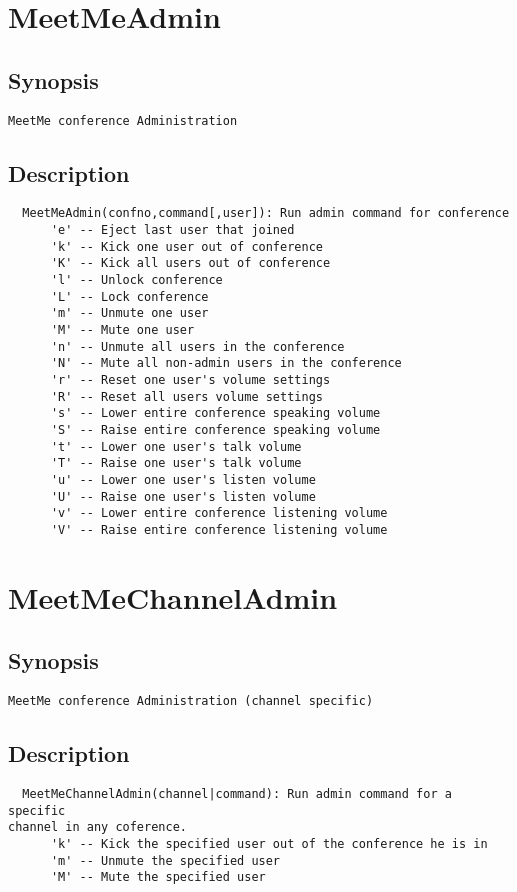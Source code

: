 \section{MeetMeAdmin}
\subsection{Synopsis}
\begin{verbatim}
MeetMe conference Administration
\end{verbatim}
\subsection{Description}
\begin{verbatim}
  MeetMeAdmin(confno,command[,user]): Run admin command for conference
      'e' -- Eject last user that joined
      'k' -- Kick one user out of conference
      'K' -- Kick all users out of conference
      'l' -- Unlock conference
      'L' -- Lock conference
      'm' -- Unmute one user
      'M' -- Mute one user
      'n' -- Unmute all users in the conference
      'N' -- Mute all non-admin users in the conference
      'r' -- Reset one user's volume settings
      'R' -- Reset all users volume settings
      's' -- Lower entire conference speaking volume
      'S' -- Raise entire conference speaking volume
      't' -- Lower one user's talk volume
      'T' -- Raise one user's talk volume
      'u' -- Lower one user's listen volume
      'U' -- Raise one user's listen volume
      'v' -- Lower entire conference listening volume
      'V' -- Raise entire conference listening volume

\end{verbatim}


\section{MeetMeChannelAdmin}
\subsection{Synopsis}
\begin{verbatim}
MeetMe conference Administration (channel specific)
\end{verbatim}
\subsection{Description}
\begin{verbatim}
  MeetMeChannelAdmin(channel|command): Run admin command for a specific
channel in any coference.
      'k' -- Kick the specified user out of the conference he is in
      'm' -- Unmute the specified user
      'M' -- Mute the specified user

\end{verbatim}


